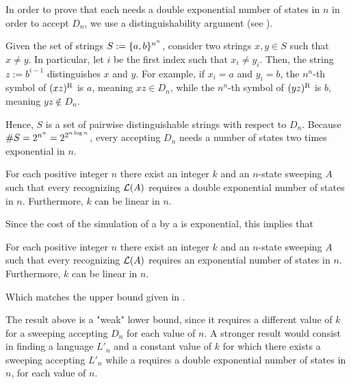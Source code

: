 In order to prove that each \ODFA needs a double exponential number of states in $n$ in order to accept $D_n$, we use a distinguishability argument (see ).

Given the set of strings $S:=\{a,b\}^{n^n}$, consider two strings $x,y\in S$ such that $x\ne y$.
In particular, let $i$ be the first index such that $x_i\ne y_i$.
Then, the string $z:=b^{i-1}$ distinguishes $x$ and $y$.
For example, if $x_i=a$ and $y_i=b$, the $n^n$-th symbol of $(xz)^{\mathrm R}$ is $a$, meaning $xz\in D_n$, while the $n^n$-th symbol of $(yz)^{\mathrm R}$ is $b$, meaning $yz\notin D_n$.

Hence, $S$ is a set of pairwise distinguishable strings with respect to $D_n$.
Because $\# S=2^{n^n}=2^{2^{n\log n}}$, every \ODFA accepting $D_n$ needs a number of states two times exponential in $n$.

\begin{thrm}
	For each positive integer $n$ there exist an integer $k$ and an $n$-state sweeping \kDLA $A$ such that every \ODFA recognizing $\mathcal L(A)$ requires a double exponential number of states in $n$.
	Furthermore, $k$ can be linear in $n$.
\end{thrm}

Since the cost of the simulation of a \ONFA by a \ODFA is exponential, this implies that

\begin{coro}
	For each positive integer $n$ there exist an integer $k$ and an $n$-state sweeping \kDLA $A$ such that every \ONFA recognizing $\mathcal L(A)$ requires an exponential number of states in $n$.
	Furthermore, $k$ can be linear in $n$.
\end{coro}

Which matches the upper bound given in .

The result above is a "weak" lower bound, since it requires a different value of $k$ for a sweeping \kDLA accepting $D_n$ for each value of $n$.
A stronger result would consist in finding a language $L'_n$ and a constant value of $k$ for which there exists a sweeping \kDLA accepting $L'_n$ while a \ODFA requires a double exponential number of states in $n$, for each value of $n$.
